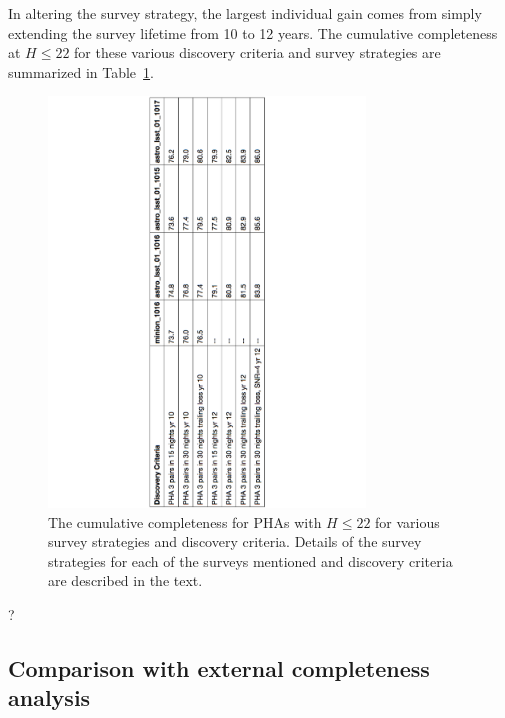 In altering the survey strategy, the largest individual gain comes from simply extending the survey lifetime from 10 to 12 years. The cumulative completeness at $H\le22$ for these various discovery criteria and survey strategies are summarized in Table~\ref{tab:completeness}. 

\begin{figure}
\centering
\includegraphics[width=0.75\textwidth]{figures/PHA_cumulative_completeness}
\caption{The cumulative completeness for PHAs with $H\le22$ for various survey strategies and discovery criteria. Details of the survey strategies for each of the surveys mentioned and discovery criteria are described in the text.
\label{tab:completeness}}
\end{figure}
?         

\subsection{Comparison with external completeness analysis}



